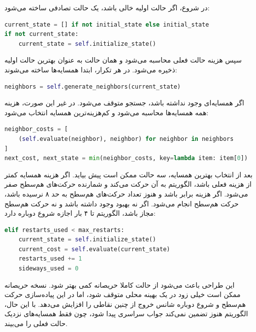 \documentclass[10.5pt]{exam}
\begin{document}
در شروع، اگر حالت اولیه خالی باشد، یک حالت تصادفی ساخته می‌شود:

\begin{latin}
\begin{lstlisting}[language=Python]
current_state = [] if not initial_state else initial_state
if not current_state:
    current_state = self.initialize_state()
\end{lstlisting}
\end{latin}

سپس هزینه حالت فعلی محاسبه می‌شود و همان حالت به عنوان بهترین حالت اولیه ذخیره می‌شود. در هر تکرار، ابتدا همسایه‌ها ساخته می‌شوند:

\begin{latin}
\begin{lstlisting}[language=Python]
neighbors = self.generate_neighbors(current_state)
\end{lstlisting}
\end{latin}

اگر همسایه‌ای وجود نداشته باشد، جستجو متوقف می‌شود. در غیر این صورت، هزینه همه همسایه‌ها محاسبه می‌شود و کم‌هزینه‌ترین همسایه انتخاب می‌شود:

\begin{latin}
\begin{lstlisting}[language=Python]
neighbor_costs = [
    (self.evaluate(neighbor), neighbor) for neighbor in neighbors
]
next_cost, next_state = min(neighbor_costs, key=lambda item: item[0])
\end{lstlisting}
\end{latin}

بعد از انتخاب بهترین همسایه، سه حالت ممکن است پیش بیاید. اگر هزینه همسایه کمتر از هزینه فعلی باشد، الگوریتم به آن حرکت می‌کند و شمارنده حرکت‌های هم‌سطح صفر می‌شود. اگر هزینه برابر باشد و هنوز تعداد حرکت‌های هم‌سطح به حد ۸ نرسیده باشد، حرکت هم‌سطح انجام می‌شود. اگر نه بهبود وجود داشته باشد و نه حرکت هم‌سطح مجاز باشد، الگوریتم تا ۴ بار اجازه شروع دوباره دارد:

\begin{latin}
\begin{lstlisting}[language=Python]
elif restarts_used < max_restarts:
    current_state = self.initialize_state()
    current_cost = self.evaluate(current_state)
    restarts_used += 1
    sideways_used = 0
\end{lstlisting}
\end{latin}

این طراحی باعث می‌شود
از حالت کاملا حریصانه کمی بهتر شود. نسخه حریصانه ممکن است خیلی زود در یک بهینه محلی متوقف شود، اما در این پیاده‌سازی حرکت هم‌سطح و شروع دوباره شانس خروج از چنین نقاطی را افزایش می‌دهد. با این حال، الگوریتم هنوز تضمین نمی‌کند جواب سراسری پیدا شود، چون فقط همسایه‌های نزدیک حالت فعلی را می‌بیند.
\end{document}
